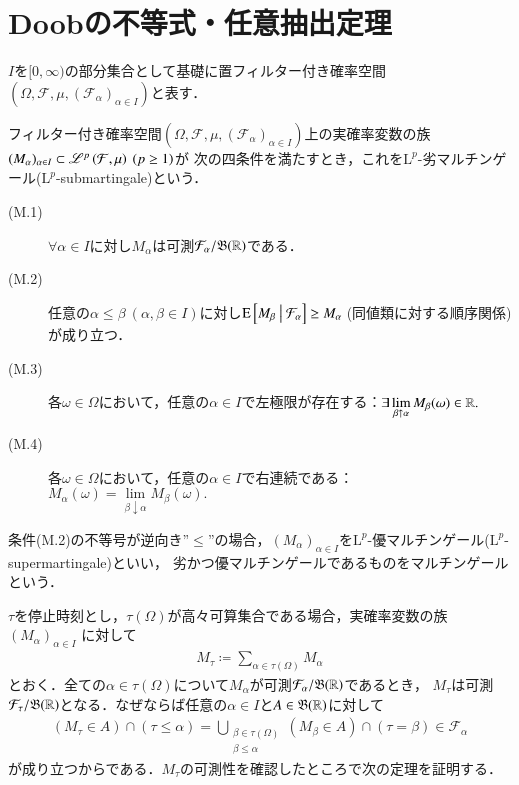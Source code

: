 \section{Doobの不等式・任意抽出定理}
	
	$I$を$[0,\infty)$の部分集合として基礎に置フィルター付き確率空間$(\Omega,\mathcal{F},\mu,(\mathcal{F}_\alpha)_{\alpha \in I})$と表す．
	
	\begin{itembox}[l]{}
		\begin{dfn}[マルチンゲール]
			フィルター付き確率空間$(\Omega,\mathcal{F},\mu,(\mathcal{F}_\alpha)_{\alpha \in I})$上の実確率変数の族
			$(M_\alpha)_{\alpha \in I} \subset \mathscr{L}^{p} \left(\mathcal{F},\mu\right)\ (p \geq 1)$が
			次の四条件を満たすとき，これを$\mathrm{L}^p$-劣マルチンゲール($\mathrm{L}^p$-submartingale)という．
			\begin{description}
				\item[(M.1)] $\forall \alpha \in I$に対し$M_\alpha$は可測$\mathcal{F}_\alpha/\mathfrak{B}(\mathbb{R})$である．
				\item[(M.2)] 任意の$\alpha \leq \beta\ (\alpha,\beta \in I)$に対し$\cexp{M_\beta}{\mathcal{F}_\alpha} \geq M_\alpha\ $({\scriptsize 同値類に対する順序関係})が成り立つ．
				\item[(M.3)] 各$\omega \in \Omega$において，任意の$\alpha \in I$で左極限が存在する：$\exists \lim\limits_{\beta \uparrow \alpha} M_\beta(\omega) \in \mathbb{R}.$
				\item[(M.4)] 各$\omega \in \Omega$において，任意の$\alpha \in I$で右連続である：$M_\alpha(\omega) = \lim\limits_{\beta \downarrow \alpha} M_\beta(\omega).$
			\end{description}
			条件(M.2)の不等号が逆向き''$\leq$''の場合，$(M_\alpha)_{\alpha \in I}$を$\mathrm{L}^p$-優マルチンゲール($\mathrm{L}^p$-supermartingale)といい，
			劣かつ優マルチンゲールであるものをマルチンゲールという．
			\label{dfn:martingale}
		\end{dfn}
	\end{itembox}
	
	$\tau$を停止時刻とし，$\tau(\Omega)$が高々可算集合である場合，実確率変数の族$(M_\alpha)_{\alpha \in I}$
	に対して
	\begin{align}
		M_\tau \coloneqq \sum_{\alpha \in \tau(\Omega)}M_\alpha
	\end{align}
	とおく．全ての$\alpha \in \tau(\Omega)$について$M_\alpha$が可測$\mathcal{F}_\alpha/\mathfrak{B}(\mathbb{R})$であるとき，
	$M_\tau$は可測$\mathcal{F}_\tau/\mathfrak{B}(\mathbb{R})$となる．なぜならば任意の$\alpha \in I$と$A \in \mathfrak{B}(\mathbb{R})$に対して
	\begin{align}
		(M_\tau \in A) \cap (\tau \leq \alpha)
		= \bigcup_{\substack{\beta \in \tau(\Omega) \\ \beta \leq \alpha}}(M_\beta \in A) \cap (\tau = \beta) \in \mathcal{F}_\alpha 
	\end{align}
	が成り立つからである．$M_\tau$の可測性を確認したところで次の定理を証明する．
	
